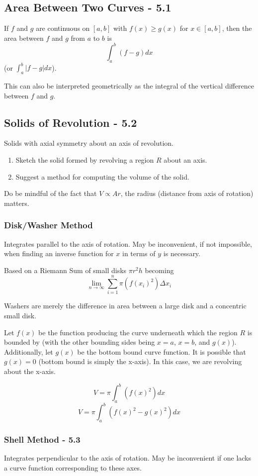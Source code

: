 \documentclass{article}
\begin{document}
\subsection{Area Between Two Curves - 5.1}
If $f$ and $g$ are continuous on $[a,b]$ with $f(x) \ge g(x)$ for $x \in [a,b]$, then the area between $f$ and $g$ from $a$ to $b$ is $$\int_{a}^{b} (f-g)dx$$ (or $\int_{a}^{b} |f-g| dx$).

This can also be interpreted geometrically as the integral of the vertical difference between $f$ and $g$.

\subsection{Solids of Revolution - 5.2}
Solids with axial symmetry about an axis of revolution.

\begin{enumerate}
    \item Sketch the solid formed by revolving a region $R$ about an axis.
    \item Suggest a method for computing the volume of the solid.
\end{enumerate}

Do be mindful of the fact that $V \propto Ar$, the radius (distance from axis of rotation) matters.

\subsubsection{Disk/Washer Method}
Integrates parallel to the axis of rotation. May be inconvenient, if not impossible, when finding an inverse function for $x$ in terms of $y$ is necessary.

Based on a Riemann Sum of small disks $\pi r^2h$ becoming $$\lim_{n \to \infty} \sum_{i=1}^{n} \pi(f(x_i)^2)\Delta x_i$$

Washers are merely the difference in area between a large disk and a concentric small disk.

Let $f(x)$ be the function producing the curve underneath which the region $R$ is bounded by (with the other bounding sides being $x = a$, $x = b$, and $g(x)$). Additionally, let $g(x)$ be the bottom bound curve function. It is possible that $g(x) = 0$ (bottom bound is simply the x-axis). In this case, we are revolving about the x-axis.

$$V = \pi \int_{a}^{b} (f(x)^2) dx$$
$$V = \pi \int_{a}^{b} (f(x)^2 - g(x)^2) dx$$

\subsubsection{Shell Method  - 5.3}
Integrates perpendicular to the axis of rotation. May be inconvenient if one lacks a curve function corresponding to these axes.
\end{document}
